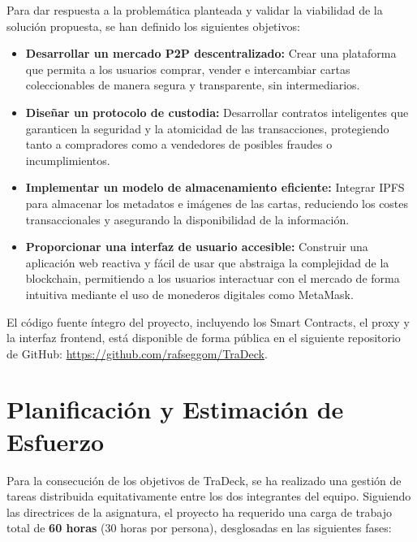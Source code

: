 Para dar respuesta a la problemática planteada y validar la viabilidad de la solución propuesta, se han definido los siguientes
objetivos:

\begin{itemize}
    \item \textbf{Desarrollar un mercado P2P descentralizado:} Crear una plataforma que permita a los usuarios comprar, 
    vender e intercambiar cartas coleccionables de manera segura y transparente, sin intermediarios.
    \item \textbf{Diseñar un protocolo de custodia:} Desarrollar contratos inteligentes que garanticen la seguridad y la atomicidad de las 
    transacciones, protegiendo tanto a compradores como a vendedores de posibles fraudes o incumplimientos.
    \item \textbf{Implementar un modelo de almacenamiento eficiente:} Integrar IPFS para almacenar los metadatos e imágenes de las cartas,
    reduciendo los costes transaccionales y asegurando la disponibilidad de la información.
    \item \textbf{Proporcionar una interfaz de usuario accesible:} Construir una aplicación web reactiva y fácil de usar que 
    abstraiga la complejidad de la blockchain, permitiendo a los usuarios interactuar con el mercado de forma intuitiva mediante
    el uso de monederos digitales como MetaMask. 

\end{itemize}

El código fuente íntegro del proyecto, incluyendo los Smart Contracts, el proxy y la interfaz frontend, está disponible de forma pública en el siguiente repositorio de GitHub: \url{https://github.com/rafseggom/TraDeck}.

\section{Planificación y Estimación de Esfuerzo}
Para la consecución de los objetivos de TraDeck, se ha realizado una gestión de tareas distribuida equitativamente entre los dos integrantes del equipo. Siguiendo las directrices de la asignatura, el proyecto ha requerido una carga de trabajo total de \textbf{60 horas} (30 horas por persona), desglosadas en las siguientes fases:

